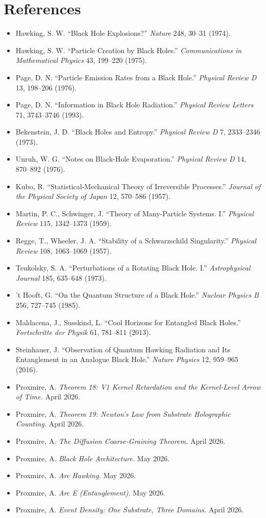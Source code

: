 \documentclass[11pt,a4paper]{article}
\begin{document}
\section*{References}

\begin{itemize}[leftmargin=*,itemsep=2pt]
  \item Hawking, S. W. ``Black Hole Explosions?'' \emph{Nature} 248, 30--31 (1974).
  \item Hawking, S. W. ``Particle Creation by Black Holes.'' \emph{Communications in Mathematical Physics} 43, 199--220 (1975).
  \item Page, D. N. ``Particle Emission Rates from a Black Hole.'' \emph{Physical Review D} 13, 198--206 (1976).
  \item Page, D. N. ``Information in Black Hole Radiation.'' \emph{Physical Review Letters} 71, 3743--3746 (1993).
  \item Bekenstein, J. D. ``Black Holes and Entropy.'' \emph{Physical Review D} 7, 2333--2346 (1973).
  \item Unruh, W. G. ``Notes on Black-Hole Evaporation.'' \emph{Physical Review D} 14, 870--892 (1976).
  \item Kubo, R. ``Statistical-Mechanical Theory of Irreversible Processes.'' \emph{Journal of the Physical Society of Japan} 12, 570--586 (1957).
  \item Martin, P. C., Schwinger, J. ``Theory of Many-Particle Systems. I.'' \emph{Physical Review} 115, 1342--1373 (1959).
  \item Regge, T., Wheeler, J. A. ``Stability of a Schwarzschild Singularity.'' \emph{Physical Review} 108, 1063--1069 (1957).
  \item Teukolsky, S. A. ``Perturbations of a Rotating Black Hole. I.'' \emph{Astrophysical Journal} 185, 635--648 (1973).
  \item 't Hooft, G. ``On the Quantum Structure of a Black Hole.'' \emph{Nuclear Physics B} 256, 727--745 (1985).
  \item Maldacena, J., Susskind, L. ``Cool Horizons for Entangled Black Holes.'' \emph{Fortschritte der Physik} 61, 781--811 (2013).
  \item Steinhauer, J. ``Observation of Quantum Hawking Radiation and Its Entanglement in an Analogue Black Hole.'' \emph{Nature Physics} 12, 959--965 (2016).
  \item Proxmire, A. \emph{Theorem 18: V1 Kernel Retardation and the Kernel-Level Arrow of Time.} April 2026.
  \item Proxmire, A. \emph{Theorem 19: Newton's Law from Substrate Holographic Counting.} April 2026.
  \item Proxmire, A. \emph{The Diffusion Coarse-Graining Theorem.} April 2026.
  \item Proxmire, A. \emph{Black Hole Architecture.} May 2026.
  \item Proxmire, A. \emph{Arc Hawking.} May 2026.
  \item Proxmire, A. \emph{Arc E (Entanglement).} May 2026.
  \item Proxmire, A. \emph{Event Density: One Substrate, Three Domains.} April 2026.
\end{itemize}
\end{document}
